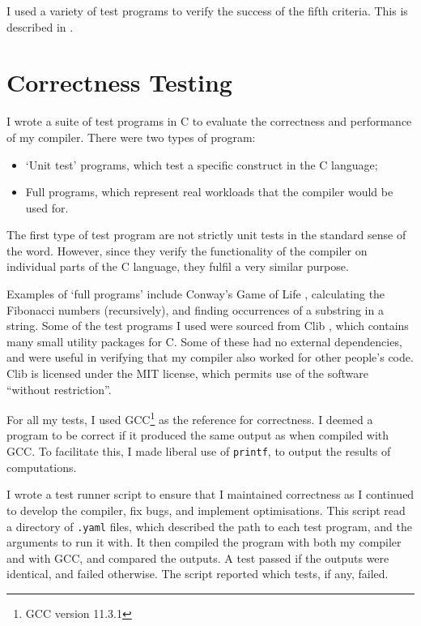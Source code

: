 \documentclass[00-main.tex]{subfiles}
\begin{document}
I used a variety of test programs to verify the success of the fifth criteria. This is described in .


\section{Correctness Testing} \label{sec:eval:testing}

I wrote a suite of test programs in C to evaluate the correctness and performance of my compiler.
There were two types of program:
\begin{itemize}
\item `Unit test' programs, which test a specific construct in the C language;
\item Full programs, which represent real workloads that the compiler would be used for.
\end{itemize}

The first type of test program are not strictly unit tests in the standard sense of the word. However, since they verify the functionality of the compiler on individual parts of the C language, they fulfil a very similar purpose.

Examples of `full programs' include Conway's Game of Life \cite{conways-game-of-life}, calculating the Fibonacci numbers (recursively), and finding occurrences of a substring in a string.
Some of the test programs I used were sourced from Clib \cite{clib}, which contains many small utility packages for C. Some of these had no external dependencies, and were useful in verifying that my compiler also worked for other people's code. Clib is licensed under the MIT license, which permits use of the software ``without restriction''.

For all my tests, I used GCC\footnote{GCC version 11.3.1} as the reference for correctness.
I deemed a program to be correct if it produced the same output as when compiled with GCC.
To facilitate this, I made liberal use of \texttt{printf}, to output the results of computations.

I wrote a test runner script to ensure that I maintained correctness as I continued to develop the compiler, fix bugs, and implement optimisations.
This script read a directory of \texttt{.yaml} files, which described the path to each test program, and the arguments to run it with.
It then compiled the program with both my compiler and with GCC, and compared the outputs.
A test passed if the outputs were identical, and failed otherwise.
The script reported which tests, if any, failed.
\end{document}
